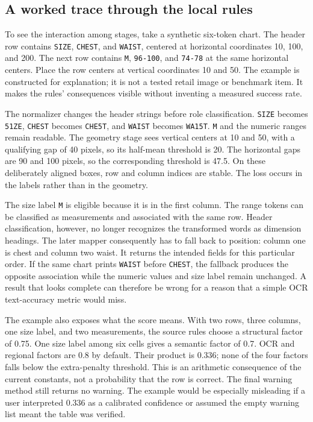 \documentclass[10pt,letterpaper]{article}
\begin{document}
\subsection{A worked trace through the local rules}

To see the interaction among stages, take a synthetic six-token chart. The header row contains \texttt{SIZE}, \texttt{CHEST}, and \texttt{WAIST}, centered at horizontal coordinates 10, 100, and 200. The next row contains \texttt{M}, \texttt{96-100}, and \texttt{74-78} at the same horizontal centers. Place the row centers at vertical coordinates 10 and 50. The example is constructed for explanation; it is not a tested retail image or benchmark item. It makes the rules' consequences visible without inventing a measured success rate.

The normalizer changes the header strings before role classification. \texttt{SIZE} becomes \texttt{51ZE}, \texttt{CHEST} becomes \texttt{CHE5T}, and \texttt{WAIST} becomes \texttt{WA15T}. \texttt{M} and the numeric ranges remain readable. The geometry stage sees vertical centers at 10 and 50, with a qualifying gap of 40 pixels, so its half-mean threshold is 20. The horizontal gaps are 90 and 100 pixels, so the corresponding threshold is 47.5. On these deliberately aligned boxes, row and column indices are stable. The loss occurs in the labels rather than in the geometry.

The size label \texttt{M} is eligible because it is in the first column. The range tokens can be classified as measurements and associated with the same row. Header classification, however, no longer recognizes the transformed words as dimension headings. The later mapper consequently has to fall back to position: column one is chest and column two waist. It returns the intended fields for this particular order. If the same chart prints \texttt{WAIST} before \texttt{CHEST}, the fallback produces the opposite association while the numeric values and size label remain unchanged. A result that looks complete can therefore be wrong for a reason that a simple OCR text-accuracy metric would miss.

The example also exposes what the score means. With two rows, three columns, one size label, and two measurements, the source rules choose a structural factor of 0.75. One size label among six cells gives a semantic factor of 0.7. OCR and regional factors are 0.8 by default. Their product is 0.336; none of the four factors falls below the extra-penalty threshold. This is an arithmetic consequence of the current constants, not a probability that the row is correct. The final warning method still returns no warning. The example would be especially misleading if a user interpreted 0.336 as a calibrated confidence or assumed the empty warning list meant the table was verified.
\end{document}
